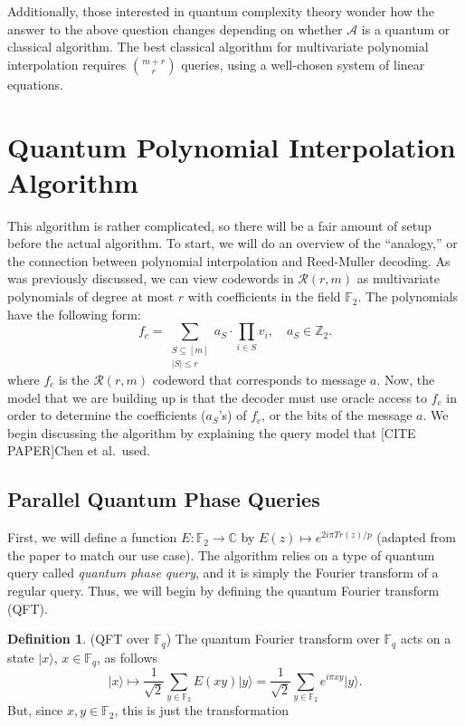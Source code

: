 \documentclass[12pt,twoside]{reedthesis}
\theoremstyle{definition}
\newtheorem{definition}[theorem]{Definition}
\newcommand{\Z}{\mathbb{Z}}
\newcommand{\C}{\mathbb{C}}
\newcommand{\F}{\mathbb{F}}
\newcommand{\ket}[1]{\ensuremath{\lvert #1\rangle}\xspace}
\begin{document}
Additionally, those interested in quantum complexity theory wonder how the answer to the above question changes depending on whether $\mathcal{A}$ is a quantum or classical algorithm. The best classical algorithm for multivariate polynomial interpolation requires ${m +r \choose r}$ queries, using a well-chosen system of linear equations.

\section{Quantum Polynomial Interpolation Algorithm}
This algorithm is rather complicated, so there will be a fair amount of setup before the actual algorithm. To start, we will do an overview of the ``analogy,'' or the connection between polynomial interpolation and Reed-Muller decoding. As was previously discussed, we can view codewords in $\mathscr{R}(r,m)$ as multivariate polynomials of degree at most $r$ with coefficients in the field $\F_2$. The polynomials have the following form:
\begin{equation*}
f_c = \sum_{\substack{S \subseteq [m] \\ \lvert S \rvert \leq r}} a_S \cdot \prod_{i \in S} v_i,  \quad a_S \in \Z_2.
\end{equation*}
where $f_c$ is the $\mathscr{R}(r,m)$ codeword that corresponds to message $a$. Now, the model that we are building up is that the decoder must use oracle access to $f_c$ in order to determine the coefficients ($a_S$'s) of $f_c$, or the bits of the message $a$. We begin discussing the algorithm by explaining the query model that [CITE PAPER]Chen et al.~used.


\subsection{Parallel Quantum Phase Queries}
 First, we will define a function $E: \F_2 \rightarrow \C$ by $E(z) \longmapsto e^{2i\pi Tr(z)/p}$ (adapted from the paper to match our use case). The algorithm relies on a type of quantum query called \textit{quantum phase query}, and it is simply the Fourier transform of a regular query. Thus, we will begin by defining the quantum Fourier transform (QFT).
 
\begin{definition}(QFT over $\F_q$) The quantum Fourier transform over $\F_q$ acts on a state $\ket{x}$, $x\in \F_q$, as follows
\begin{equation*}
\ket{x}  \longmapsto \frac{1}{\sqrt{2}}\sum_{y\in \F_2} E(xy)\ket{y}
=  \frac{1}{\sqrt{2}}\sum_{y\in \F_2} e^{i\pi xy}\ket{y}.
\end{equation*}
But, since $x,y \in \F_2$, this is just the transformation
\end{definition}
\end{document}
